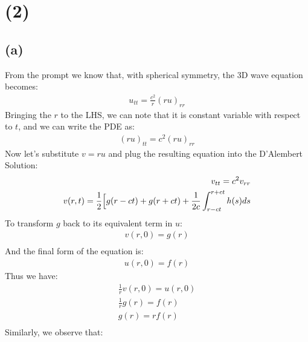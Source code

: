 \documentclass{article}
\begin{document}
\section*{\textbf{(2)}}
\subsection*{\textbf{(a)}}
From the prompt we know that, with spherical symmetry, the 3D wave equation becomes:
\begin{equation}
\begin{aligned}
u_{tt} = \frac{c^2}{r}(ru)_{rr}
\end{aligned}
\end{equation}
Bringing the $r$ to the LHS, we can note that it is constant variable with respect to $t$, and we can write the PDE as:
\begin{equation}
\begin{aligned}
(ru)_{tt} = c^2(ru)_{rr}
\end{aligned}
\end{equation}
Now let's substitute $v= ru$ and plug the resulting equation into the D'Alembert Solution:
\begin{equation}
\begin{aligned}
v_{tt} = c^2v_{rr}\\
v(r,t) = \frac{1}{2} \Big{[}g(r - ct) + g(r + ct) + \frac{1}{2c}\int^{r+ct}_{r-ct}h(s)ds
\end{aligned}
\end{equation}
To transform $g$ back to its equivalent term in $u$:
\begin{equation}
\begin{aligned}
v(r,0) = g(r)\\
\end{aligned}
\end{equation}
And the final form of the equation is:
\begin{equation}
\begin{aligned}
u(r,0) = f(r)
\end{aligned}
\end{equation}
Thus we have:
\begin{equation}
\begin{aligned}
\frac{1}{r}v(r,0) = u(r,0)\\
\frac{1}{r}g(r) = f(r)\\
g(r) = r f(r)\\
\end{aligned}
\end{equation}
Similarly, we observe that:
\end{document}

